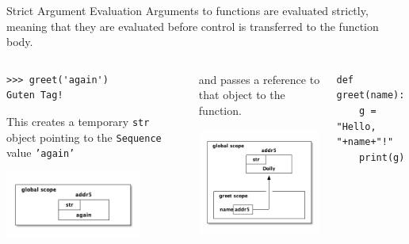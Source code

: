 \documentclass[smaller, aspectratio=1610]{beamer}
\begin{document}
\begin{frame}[label={sec:org9f752d9},fragile]{Strict Argument Evaluation}
 Arguments to functions are evaluated strictly, meaning that they are evaluated before control is transferred to the function body.

\begin{columns}
\begin{column}{0.3\columnwidth}
\begin{block}{}
\lstset{language=Python,label= ,caption= ,captionpos=b,numbers=none}
\begin{lstlisting}
>>> greet('again')
Guten Tag!
\end{lstlisting}

This creates a temporary \texttt{str} object pointing to the \texttt{Sequence} value \texttt{'again'}

\begin{center}
\includegraphics[width=1.75in]{diagrams/again.png}
\end{center}
\end{block}
\end{column}

\begin{column}{0.3\columnwidth}
\begin{block}{}
and passes a reference to that object to the function.

\begin{center}
\includegraphics[width=1.75in]{diagrams/greet-again.png}
\end{center}
\end{block}
\end{column}


\begin{column}{0.3\columnwidth}
\begin{block}{}
\lstset{language=Python,label= ,caption= ,captionpos=b,numbers=none,basicstyle=\ttfamily\scriptsize, numbers=left}
\begin{lstlisting}
def greet(name):
    g = "Hello, "+name+"!"
    print(g)
\end{lstlisting}


\end{block}
\end{column}
\end{columns}
\end{frame}
\end{document}
